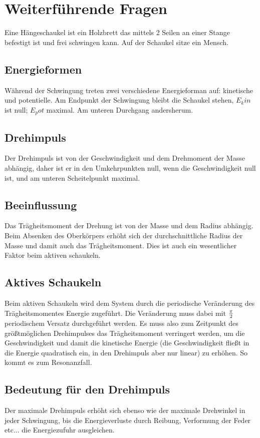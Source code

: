 


\section{Weiterführende Fragen}

Eine Hängeschaukel ist ein Holzbrett das mittels 2 Seilen an einer Stange befestigt ist und frei schwingen kann.
Auf der Schaukel sitze ein Mensch.

\subsection{Energieformen}

Während der Schwingung treten zwei verschiedene Energieforman auf: kinetische und potentielle.
Am Endpunkt der Schwingung bleibt die Schaukel stehen, $E_kin$ ist null; $E_pot$ maximal.
Am unteren Durchgang andersherum.

\subsection{Drehimpuls}

Der Drehimpuls ist von der Geschwindigkeit und dem Drehmoment der Masse abhängig, daher ist er in den Umkehrpunkten null, wenn die Geschwindigkeit null ist, und am unteren Scheitelpunkt maximal.

\subsection{Beeinflussung}

Das Trägheitsmoment der Drehung ist von der Masse und dem Radius abhängig. Beim Absenken des Oberkörpers erhöht sich der durchschnittliche Radius der Masse und damit auch das Trägheitsmoment.
Dies ist auch ein wesentlicher Faktor beim aktiven schaukeln.

\subsection{Aktives Schaukeln}

Beim aktiven Schaukeln wird dem System durch die periodische Veränderung des Trägheitsmomentes Energie zugeführt.
Die Veränderung muss dabei mit $\pi \over 2$ periodischem Versatz durchgeführt werden.
Es muss also zum Zeitpunkt des größtmöglichen Drehimpulses das Trägheitsmoment verringert werden, um die Geschwindigkeit und damit die kinetische Energie (die Geschwindigkeit fließt in die Energie quadratisch ein, in den Drehimpuls aber nur linear) zu erhöhen.
So kommt es zum Resonanzfall.

\subsection{Bedeutung für den Drehimpuls}

Der maximale Drehimpuls erhöht sich ebenso wie der maximale Drehwinkel in jeder Schwingung, bis die Energieverluste durch Reibung, Verformung der Feder etc... die Energiezufuhr ausgleichen.